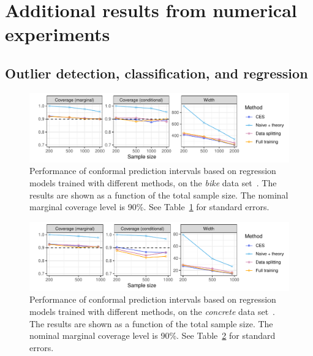 \clearpage

\section{Additional results from numerical experiments} \label{app:numerical-results}

\subsection{Outlier detection, classification, and regression}

\begin{figure}[!htb]
    \centering
    \includegraphics[width=0.8\linewidth]{figures/exp_regression_bike.pdf}
    \caption{Performance of conformal prediction intervals based on regression models trained with different methods, on the {\em bike} data set~\cite{data-bike}. The results are shown as a function of the total sample size. The nominal marginal coverage level is 90\%. See Table~\ref{fig:exp_regression_bike} for standard errors.}
    \label{fig:exp_regression_bike}
\end{figure}

\begin{figure}[!htb]
    \centering
    \includegraphics[width=0.8\linewidth]{figures/exp_regression_concrete.pdf}
    \caption{Performance of conformal prediction intervals based on regression models trained with different methods, on the {\em concrete} data set~\cite{data-concrete}. The results are shown as a function of the total sample size. The nominal marginal coverage level is 90\%. See Table~\ref{fig:exp_regression_concrete} for standard errors.}
    \label{fig:exp_regression_concrete}
\end{figure}



\begin{table}[!htb]
\centering
    \caption{Performance of outlier detection based on classification models trained with different methods, on the {\em CIFAR10} data set~\cite{cifar10}. Other details are as in Figure~\ref{fig:exp_oc}. The numbers in parenthesis indicate standard errors. The numbers in bold highlight TPR values within 1 standard error of the best TPR across all methods, for each sample size.}
  \label{tab:exp_oc}
  
\end{table}

